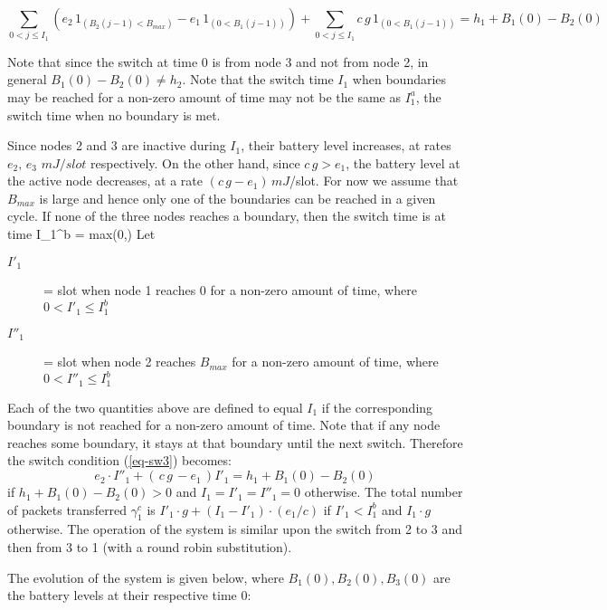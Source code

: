 \documentclass[12 pt]{article}
\newcommand{\debug}[1]{\mbox{\tt #1}}
\renewcommand{\debug}[1]{}              \newcommand{\cmd}[1]{}
\newcommand{\daddcontentsline}[3]{\addcontentsline{#1}{#2}{#3}}
\newcommand{\2}{\>\>}
\newcommand{\3}{\>\>\>}
\newcommand{\4}{\>\>\>\>}
\newcommand{\5}{\>\>\>\>\>}
\newcommand{\6}{\>\>\>\>\>\>}
\newcommand{\7}{\6\>}
\newcommand{\8}{\6\2}
\newcommand{\EB}{\begin{equation}\cmd{EB}}
\newcommand{\EE}[1]{ \debug{\fbox{\sname #1}}\label{\sname #1} \end{equation}\cmd{EE} }
\newcommand{\sname}{}
\newcommand{\pname}{}
\newcommand{\dref}[1]{\ref{#1}\debug{[#1]}\cmd{dref}}
\newcommand{\ls}[1]{\renewcommand{\baselinestretch}{#1}\large \normalsize}
\newcounter{protblock}
\newcounter{line}[protblock]
\begin{document}
\EB
\sum\limits_{0<j\le I_1}( e_2\,1_{( B_2(j-1) < B_{max})}- e_1\,1_{(0< B_1(j-1) )} )+\sum\limits_{0<j\le I_1}c\,g\,1_{(0< B_1(j-1) )}=h_1+ B_1(0) - B_2(0)
\EE{eq-sw3}

Note that since the switch at time 0 is from node 3 and not from node 2, in general $B_1(0) - B_2(0) \neq h_2$.
Note that the switch time $I_1$ when boundaries may be reached for a non-zero amount of time may not be the same as $I_1^a$, the switch time when no boundary is met.

Since nodes 2 and 3 are inactive during $I_1$, their battery level increases, at rates $e_2 , \, e_3 \,\,mJ /slot$ respectively.  On the other hand, since $c\,g > e_1$, the battery level at the active node decreases, at a rate $(c\,g - e_1)\, mJ $/slot.  For now we assume that $B_{max}$ is large and hence only one of the boundaries can be reached in a given cycle.  If none of the three nodes reaches a boundary, then the switch time is at time
\SB
I_1^b = max\left(0,\right)
\SE
Let
\begin{description}
  \item[$I'_1$] = slot when node 1 reaches $0$ for a non-zero amount of time, where $0 < I'_1 \leq I_1^b$
  \item[$I''_1$] = slot when node 2 reaches $B_{max}$ for a non-zero amount of time, where $0 < I''_1 \leq I_1^b$
  \end{description}

Each of the two quantities above are defined to equal $I_1$ if the corresponding boundary is not reached for a non-zero amount of time.  Note that if any node reaches some boundary, it stays at that boundary until the next switch.
Therefore the switch condition (\dref{eq-sw3}) becomes:
\EB
e_2\cdot I''_1 + (\, c\, g\, - e_1\,)I'_1 = h_1 + B_1(0) - B_2(0)
\EE{eq-swCC3}
if $h_1 + B_1(0) - B_2(0) > 0$ and $I_1 = I'_1 = I''_1 = 0$ otherwise.
The  total number of packets transferred $\gamma^c_1$ is $I'_1\cdot g + (I_1-I'_1)\cdot (e_1/c) $ if $I'_1 < I_1^b$ and $I_1\cdot g $ otherwise.
The operation of the system is similar upon the switch from 2 to 3 and then from 3 to 1 (with a round robin substitution).


The evolution of the system is given below, where $B_1(0), B_2(0), B_3(0)$ are the battery levels at their respective time 0:

\vspace{1cm}



\ls{0.3}\renewcommand{\pname}{X3}\daddcontentsline{lot}{table}{\debug{\fbox{\pname}}}
\end{document}
